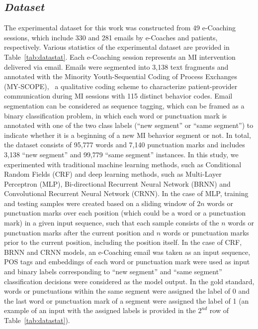 \documentclass{amia}
\begin{document}
\subsection*{\textit{Dataset}}
The experimental dataset for this work was constructed from 49 e-Coaching sessions, which include 330 and 281 emails by e-Coaches and patients, respectively. Various statistics of the experimental dataset are provided in Table~\ref{tab:datastat}. Each e-Coaching session represents an MI intervention delivered via email. Emails were segmented into 3,138 text fragments and annotated with the Minority Youth-Sequential Coding of Process Exchanges (MY-SCOPE),~\cite{carcone2013provider} a qualitative coding scheme to characterize patient-provider communication during MI sessions with 115 distinct behavior codes. Email segmentation can be considered as sequence tagging, which can be framed as a binary classification problem, in which each word or punctuation mark is annotated with one of the two class labels (``new segment'' or ``same segment'') to indicate whether it is a beginning of a new MI behavior segment or not. In total, the dataset consists of 95,777 words and 7,140 punctuation marks and includes 3,138 ``new segment'' and 99,779 ``same segment'' instances. In this study, we experimented with traditional machine learning methods, such as Conditional Random Fields (CRF)\cite{lafferty2001conditional} and deep learning methods, such as Multi-Layer Perceptron (MLP),\cite{rumelhart1986learning} Bi-directional Recurrent Neural Network (BRNN)\cite{schuster1997bidirectional} and Convolutional Recurrent Neural Network (CRNN).\cite{treviso2017sentence} In the case of MLP, training and testing samples were created based on a sliding window of $2n$ words or punctuation marks over each position (which could be a word or a punctuation mark) in a given input sequence, such that each sample consists of the $n$ words or punctuation marks after the current position and $n$ words or punctuation marks prior to the current position, including the position itself. In the case of CRF, BRNN and CRNN models, an e-Coaching email was taken as an input sequence, POS tags and embeddings of each word or punctuation mark were used as input and binary labels corresponding to ``new segment'' and ``same segment'' classification decisions were considered as the model output. In the gold standard, words or punctuations within the same segment were assigned the label of 0 and the last word or punctuation mark of a segment were assigned the label of 1 (an example of an input with the assigned labels is provided in the $2^{nd}$ row of Table~\ref{tab:datastat}). 
\end{document}
